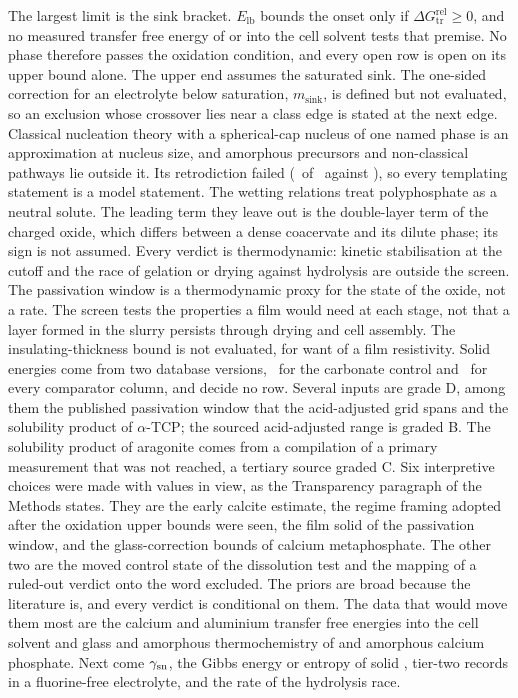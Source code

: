 The largest limit is the sink bracket. %
$E_\mathrm{lb}$ bounds the onset only if $\Delta G_\mathrm{tr}^\mathrm{rel}\ge0$, and no measured transfer free energy of  or  into the cell solvent tests that premise. %
No phase therefore passes the oxidation condition, and every open row is open on its upper bound alone. %
The upper end assumes the saturated sink\nacreSinkMark. %
The one-sided correction for an electrolyte below saturation, $m_\mathrm{sink}$, is defined but not evaluated, so an exclusion whose crossover lies near a class edge is stated at the next edge. %
Classical nucleation theory with a spherical-cap nucleus of one named phase is an approximation at nucleus size, and amorphous precursors and non-classical pathways lie outside it. %
Its retrodiction failed (\NumRetroCorrect\ of \NumRetroUsableCases\ against \NumRetroPassCount), so every templating statement is a model statement. %
The wetting relations treat polyphosphate as a neutral solute. %
The leading term they leave out is the double-layer term of the charged oxide, which differs between a dense coacervate and its dilute phase; its sign is not assumed. %
Every verdict is thermodynamic: kinetic stabilisation at the cutoff and the race of gelation or drying against hydrolysis are outside the screen. %
The passivation window is a thermodynamic proxy for the state of the oxide, not a rate. %
The screen tests the properties a film would need at each stage, not that a layer formed in the slurry persists through drying and cell assembly. %
The insulating-thickness bound is not evaluated, for want of a film resistivity. %
Solid energies come from two database versions, \NumMpDatabaseVersion\ for the carbonate control and \NumMpDatabaseVersionComparator\ for every comparator column, and decide no row. %
Several inputs are grade D, among them the published passivation window that the acid-adjusted grid spans and the solubility product of $\alpha$-TCP; the sourced acid-adjusted range is graded B. %
The solubility product of aragonite comes from a compilation of a primary measurement that was not reached, a tertiary source graded C. %
Six interpretive choices were made with values in view, as the Transparency paragraph of the Methods states. %
They are the early calcite estimate, the regime framing adopted after the oxidation upper bounds were seen, the film solid of the passivation window, and the glass-correction bounds of calcium metaphosphate. %
The other two are the moved control state of the dissolution test and the mapping of a ruled-out verdict onto the word excluded. %
The priors are broad because the literature is, and every verdict is conditional on them. %
The data that would move them most are the calcium and aluminium transfer free energies into the cell solvent and glass and amorphous thermochemistry of  and amorphous calcium phosphate. %
Next come $\gamma_\mathrm{sn}$, the Gibbs energy or entropy of solid , tier-two records in a fluorine-free electrolyte, and the rate of the hydrolysis race. %

